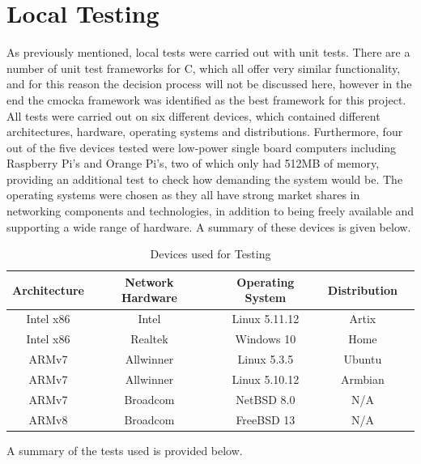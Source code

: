 \documentclass[a4paper, 11pt]{report}
\begin{document}
\section{Local Testing} \label{loctest}
As previously mentioned, local tests were carried out with unit tests. There are a number of unit test frameworks for C, which all offer very similar functionality, and for this reason the decision process will not be discussed here, however in the end the cmocka\cite{cmocka} framework was identified as the best framework for this project. All tests were carried out on six different devices, which contained different architectures, hardware, operating systems and distributions. Furthermore, four out of the five devices tested were low-power single board computers including Raspberry Pi's and Orange Pi's, two of which only had 512MB of memory, providing an additional test to check how demanding the system would be. The operating systems were chosen as they all have strong market shares in networking components and technologies, in addition to being freely available and supporting a wide range of hardware. A summary of these devices is given below.

\begin{table}[H]
\centering
\begin{tabular}{ |c|c|c|c|c| } 
\hline
Architecture & Network Hardware & Operating System & Distribution\\
\hline
Intel x86 & Intel & Linux 5.11.12 & Artix\\
Intel x86 & Realtek & Windows 10 & Home\\
ARMv7 & Allwinner & Linux 5.3.5 & Ubuntu\\
ARMv7 & Allwinner & Linux 5.10.12 & Armbian\\
ARMv7 & Broadcom & NetBSD 8.0 & N/A\\
ARMv8 & Broadcom & FreeBSD 13 & N/A\\
\hline
\end{tabular}
\caption{Devices used for Testing}
\label{tab:testdevices}
\end{table}

\iffalse
A summary of the tests used is provided below.
\end{document}
